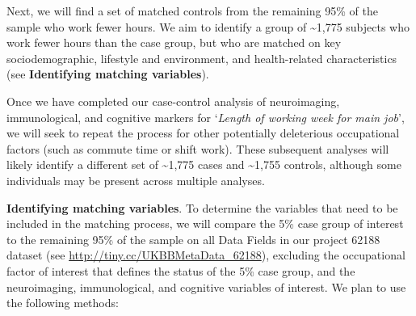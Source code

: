 \documentclass[
  english,
  man, donotrepeattitle,floatsintext]{apa6}
\begin{document}
Next, we will find a set of matched controls from the remaining 95\% of the sample who work fewer hours. We aim to identify a group of \textasciitilde1,775 subjects who work fewer hours than the case group, but who are matched on key sociodemographic, lifestyle and environment, and health-related characteristics (see \textbf{Identifying matching variables}).

Once we have completed our case-control analysis of neuroimaging, immunological, and cognitive markers for `\emph{Length of working week for main job}', we will seek to repeat the process for other potentially deleterious occupational factors (such as commute time or shift work). These subsequent analyses will likely identify a different set of \textasciitilde1,775 cases and \textasciitilde1,755 controls, although some individuals may be present across multiple analyses.

\textbf{Identifying matching variables}. To determine the variables that need to be included in the matching process, we will compare the 5\% case group of interest to the remaining 95\% of the sample on all Data Fields in our project 62188 dataset (see \url{http://tiny.cc/UKBBMetaData_62188}), excluding the occupational factor of interest that defines the status of the 5\% case group, and the neuroimaging, immunological, and cognitive variables of interest. We plan to use the following methods:
\end{document}
